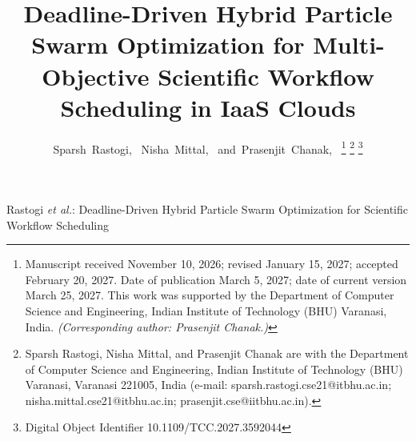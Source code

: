 \documentclass[journal]{IEEEtran}
\begin{document}
\title{Deadline-Driven Hybrid Particle Swarm Optimization for Multi-Objective Scientific Workflow Scheduling in IaaS Clouds}

\author{Sparsh~Rastogi,~
        Nisha~Mittal,~
        and~Prasenjit~Chanak,~%
\thanks{Manuscript received November 10, 2026; revised January 15, 2027; accepted February 20, 2027. Date of publication March 5, 2027; date of current version March 25, 2027. This work was supported by the Department of Computer Science and Engineering, Indian Institute of Technology (BHU) Varanasi, India. \textit{(Corresponding author: Prasenjit Chanak.)}}%
\thanks{Sparsh Rastogi, Nisha Mittal, and Prasenjit Chanak are with the Department of Computer Science and Engineering, Indian Institute of Technology (BHU) Varanasi, Varanasi 221005, India (e-mail: sparsh.rastogi.cse21@itbhu.ac.in; nisha.mittal.cse21@itbhu.ac.in; prasenjit.cse@iitbhu.ac.in).}%
\thanks{Digital Object Identifier 10.1109/TCC.2027.3592044}}

%
{Rastogi \MakeLowercase{\textit{et al.}}: Deadline-Driven Hybrid Particle Swarm Optimization for Scientific Workflow Scheduling}

\maketitle
\end{document}
